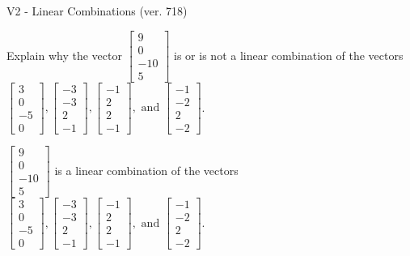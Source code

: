 \begin{exercise}
  \begin{exerciseTitle}V2 - Linear Combinations (ver. 718)\end{exerciseTitle}
  \begin{exerciseStatement}
    Explain why the vector \(\left[\begin{array}{c}
9 \\
0 \\
-10 \\
5
\end{array}\right]\)  is or is not a linear 
	combination of the vectors \(\left[\begin{array}{c}
3 \\
0 \\
-5 \\
0
\end{array}\right] , \left[\begin{array}{c}
-3 \\
-3 \\
2 \\
-1
\end{array}\right] , \left[\begin{array}{c}
-1 \\
2 \\
2 \\
-1
\end{array}\right] , \text{ and } \left[\begin{array}{c}
-1 \\
-2 \\
2 \\
-2
\end{array}\right]\).
	


  \end{exerciseStatement}
  \begin{exerciseAnswer}
   \(\left[\begin{array}{c}
9 \\
0 \\
-10 \\
5
\end{array}\right]\) 
  	 is  
	a linear combination of the vectors \(\left[\begin{array}{c}
3 \\
0 \\
-5 \\
0
\end{array}\right] , \left[\begin{array}{c}
-3 \\
-3 \\
2 \\
-1
\end{array}\right] , \left[\begin{array}{c}
-1 \\
2 \\
2 \\
-1
\end{array}\right] , \text{ and } \left[\begin{array}{c}
-1 \\
-2 \\
2 \\
-2
\end{array}\right]\).


\end{exerciseAnswer}
\end{exercise}
